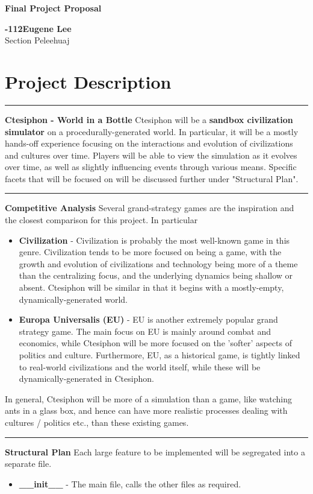 \documentclass[11pt, onecolumn]{article}
\newcommand{\titleName}{Final Project Proposal}
\newcommand{\class}{15-112}
\newcommand{\recitation}{P}
\newcommand{\heading}[1]{\section*{#1}
\hrule
\vspace*{0.5\baselineskip}}
\begin{document}
{\noindent\Huge\bf {\selectfont  \titleName}}\\[1.0\baselineskip] 
{ {\bf {}\selectfont \class  \hfill {\large Eugene Lee}}\\
Section \recitation \hfill eleehuaj
\\[0.5\baselineskip]
\heading{Project Description}
\textbf{\large{Ctesiphon - World in a Bottle}}
Ctesiphon will be a \textbf{sandbox civilization simulator} on a procedurally-generated world. In particular, it will be a mostly hands-off experience focusing on the interactions and evolution of civilizations and cultures over time. Players will be able to view the simulation as it evolves over time, as well as slightly influencing events through various means. Specific facets that will be focused on will be discussed further under "Structural Plan".
\\
\hrule
\textbf{\large{Competitive Analysis}}
Several grand-strategy games are the inspiration and the closest comparison for this project. In particular
\begin{itemize}
    \item \textbf{Civilization} - Civilization is probably the most well-known game in this genre. Civilization tends to be more focused on being a game, with the growth and evolution of civilizations and technology being more of a theme than the centralizing focus, and the underlying dynamics being shallow or absent. Ctesiphon will be similar in that it begins with a mostly-empty, dynamically-generated world.
    \item \textbf{Europa Universalis (EU)} - EU is another extremely popular grand strategy game. The main focus on EU is mainly around combat and economics, while Ctesiphon will be more focused on the 'softer' aspects of politics and culture. Furthermore, EU, as a historical game, is tightly linked to real-world civilizations and the world itself, while these will be dynamically-generated in Ctesiphon.
\end{itemize}
In general, Ctesiphon will be more of a simulation than a game, like watching ants in a glass box, and hence can have more realistic processes dealing with cultures / politics etc., than these existing games.
\\
\hrule
\textbf{\large{Structural Plan}}
Each large feature to be implemented will be segregated into a separate file.
\begin{itemize}
    \item \textbf{__init__} - The main file, calls the other files as required.

\end{itemize}}
\end{document}
